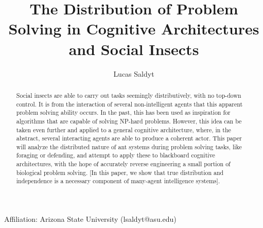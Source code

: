 \documentclass{nature}
\title{The Distribution of Problem Solving in Cognitive Architectures and Social Insects}
\author{Lucas Saldyt}
\begin{document}
\maketitle

\begin{affiliations}
    \item Affiliation: Arizona State University (lsaldyt@asu.edu)
\end{affiliations}

\begin{abstract}
    Social insects are able to carry out tasks seemingly distributively, with no top-down control.
    It is from the interaction of several non-intelligent agents that this apparent problem solving ability occurs.
    In the past, this has been used as inspiration for algorithms that are capable of solving NP-hard problems. 
    However, this idea can be taken even further and applied to a general cognitive architecture, where, in the abstract, several interacting agents are able to produce a coherent actor.
    This paper will analyze the distributed nature of ant systems during problem solving tasks, like foraging or defending, and attempt to apply these to blackboard cognitive architectures, with the hope of accurately reverse engineering a small portion of biological problem solving.
    [In this paper, we show that true distribution and independence is a necessary component of many-agent intelligence systems].


\end{abstract}

\end{document}
